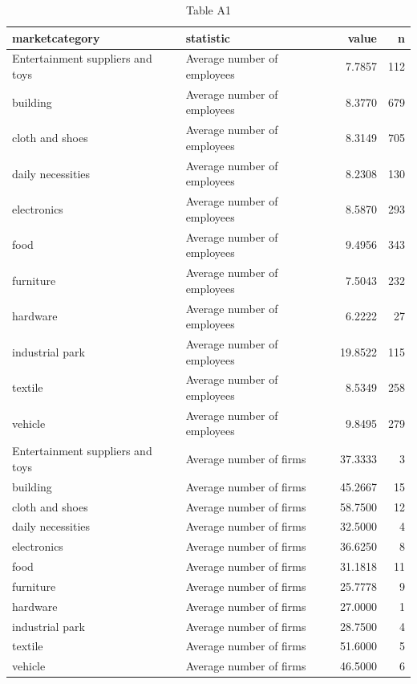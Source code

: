 \begin{table}

\caption{Table A1}
\centering
\begin{tabular}[t]{llrr}
\toprule
marketcategory & statistic & value & n\\
\midrule
Entertainment suppliers and toys & Average number of employees & 7.7857 & 112\\
building & Average number of employees & 8.3770 & 679\\
cloth and shoes & Average number of employees & 8.3149 & 705\\
daily necessities & Average number of employees & 8.2308 & 130\\
electronics & Average number of employees & 8.5870 & 293\\
\addlinespace
food & Average number of employees & 9.4956 & 343\\
furniture & Average number of employees & 7.5043 & 232\\
hardware & Average number of employees & 6.2222 & 27\\
industrial park & Average number of employees & 19.8522 & 115\\
textile & Average number of employees & 8.5349 & 258\\
\addlinespace
vehicle & Average number of employees & 9.8495 & 279\\
Entertainment suppliers and toys & Average number of firms & 37.3333 & 3\\
building & Average number of firms & 45.2667 & 15\\
cloth and shoes & Average number of firms & 58.7500 & 12\\
daily necessities & Average number of firms & 32.5000 & 4\\
\addlinespace
electronics & Average number of firms & 36.6250 & 8\\
food & Average number of firms & 31.1818 & 11\\
furniture & Average number of firms & 25.7778 & 9\\
hardware & Average number of firms & 27.0000 & 1\\
industrial park & Average number of firms & 28.7500 & 4\\
\addlinespace
textile & Average number of firms & 51.6000 & 5\\
vehicle & Average number of firms & 46.5000 & 6\\
\bottomrule
\end{tabular}
\end{table}
